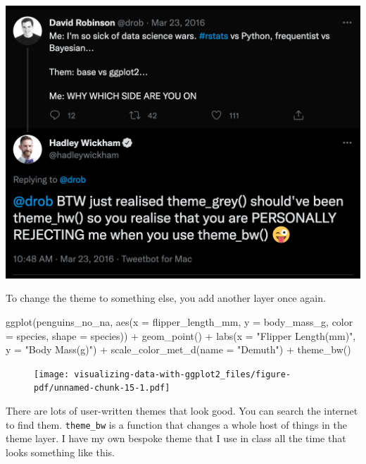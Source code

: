 \documentclass[
  letterpaper,
  DIV=11,
  numbers=noendperiod,
  oneside]{scrreprt}
\newenvironment{Shaded}{\begin{snugshade}}{\end{snugshade}}
\newcommand{\AttributeTok}[1]{\textcolor[rgb]{0.40,0.45,0.13}{#1}}
\newcommand{\FunctionTok}[1]{\textcolor[rgb]{0.28,0.35,0.67}{#1}}
\newcommand{\NormalTok}[1]{\textcolor[rgb]{0.00,0.23,0.31}{#1}}
\newcommand{\SpecialCharTok}[1]{\textcolor[rgb]{0.37,0.37,0.37}{#1}}
\newcommand{\StringTok}[1]{\textcolor[rgb]{0.13,0.47,0.30}{#1}}
\begin{document}
\includegraphics{figs/hadley_theme_grey.png}

To change the theme to something else, you add another layer once again.

\begin{Shaded}
\begin{Highlighting}[]
\FunctionTok{ggplot}\NormalTok{(penguins\_no\_na,}
      \FunctionTok{aes}\NormalTok{(}\AttributeTok{x =}\NormalTok{ flipper\_length\_mm,}
          \AttributeTok{y =}\NormalTok{ body\_mass\_g,}
         \AttributeTok{color =}\NormalTok{ species,}
         \AttributeTok{shape =}\NormalTok{ species)) }\SpecialCharTok{+}
\FunctionTok{geom\_point}\NormalTok{() }\SpecialCharTok{+}
\FunctionTok{labs}\NormalTok{(}\AttributeTok{x =} \StringTok{"Flipper Length(mm)"}\NormalTok{, }\AttributeTok{y =} \StringTok{"Body Mass(g)"}\NormalTok{) }\SpecialCharTok{+}
\FunctionTok{scale\_color\_met\_d}\NormalTok{(}\AttributeTok{name =} \StringTok{"Demuth"}\NormalTok{) }\SpecialCharTok{+}
\FunctionTok{theme\_bw}\NormalTok{()}
\end{Highlighting}
\end{Shaded}

\begin{figure}[H]

{\centering \texttt{[image: visualizing-data-with-ggplot2\_files/figure-pdf/unnamed-chunk-15-1.pdf]}

}

\end{figure}

There are lots of user-written themes that look good. You can search the
internet to find them. \texttt{theme\_bw} is a function that changes a
whole host of things in the theme layer. I have my own bespoke theme
that I use in class all the time that looks something like this.
\end{document}
